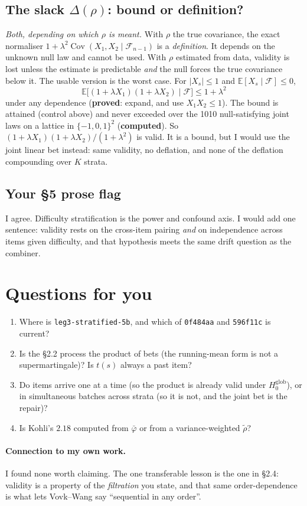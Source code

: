 \documentclass[11pt]{article}
\newcommand{\E}{\mathbb{E}}
\newcommand{\Cov}{\operatorname{Cov}}
\newcommand{\Fc}{\mathcal{F}}
\begin{document}
\subsection{The slack $\Delta(\rho)$: bound or definition?}
\emph{Both, depending on which $\rho$ is meant.} With $\rho$ the true covariance, the exact normaliser $1+\lambda^2\Cov(X_1,X_2\mid\Fc_{n-1})$ is a \emph{definition}. It depends on the unknown null law and cannot be used. With $\rho$ estimated from data, validity is lost unless the estimate is predictable \emph{and} the null forces the true covariance below it. The usable version is the worst case. For $|X_s|\le1$ and $\E[X_s\mid\Fc]\le0$,
\[
\E\big[(1+\lambda X_1)(1+\lambda X_2)\mid\Fc\big]\le1+\lambda^2
\]
under any dependence (\textbf{proved}: expand, and use $X_1X_2\le1$). The bound is attained (control above) and never exceeded over the 1010 null-satisfying joint laws on a lattice in $\{-1,0,1\}^2$ (\textbf{computed}). So $(1+\lambda X_1)(1+\lambda X_2)/(1+\lambda^2)$ is valid. It is a bound, but I would use the joint linear bet instead: same validity, no deflation, and none of the deflation compounding over $K$ strata.

\subsection{Your \S5 prose flag}
I agree. Difficulty stratification is the power and confound axis. I would add one sentence: validity rests on the cross-item pairing \emph{and} on independence across items given difficulty, and that hypothesis meets the same drift question as the combiner.

\section*{Questions for you}
\begin{enumerate}[nosep]
\item Where is \texttt{leg3-stratified-5b}, and which of \texttt{0f484aa} and \texttt{596f11c} is current?
\item Is the \S2.2 process the product of bets (the running-mean form is not a supermartingale)? Is $t(s)$ always a past item?
\item Do items arrive one at a time (so the product is already valid under $H_0^{\mathrm{glob}}$), or in simultaneous batches across strata (so it is not, and the joint bet is the repair)?
\item Is Kohli's $2.18$ computed from $\bar\varphi$ or from a variance-weighted $\tilde\rho$?
\end{enumerate}
\paragraph{Connection to my own work.} I found none worth claiming. The one transferable lesson is the one in \S2.4: validity is a property of the \emph{filtration} you state, and that same order-dependence is what lets Vovk--Wang say ``sequential in any order''.
\end{document}
